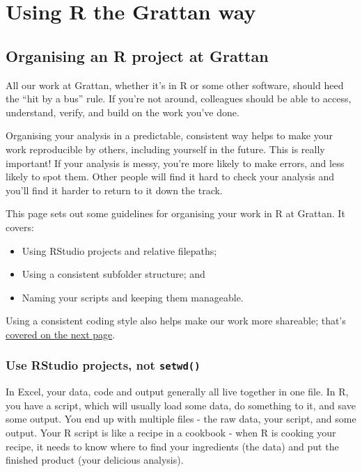 \documentclass[
]{book}
\providecommand{\tightlist}{%
  \setlength{\itemsep}{0pt}\setlength{\parskip}{0pt}}
\begin{document}
\hypertarget{part-using-r-the-grattan-way}{%
\part{Using R the Grattan way}\label{part-using-r-the-grattan-way}}

\hypertarget{organising-projects}{%
\chapter{Organising an R project at Grattan}\label{organising-projects}}

All our work at Grattan, whether it's in R or some other software, should heed the ``hit by a bus'' rule. If you're not around, colleagues should be able to access, understand, verify, and build on the work you've done.

Organising your analysis in a predictable, consistent way helps to make your work reproducible by others, including yourself in the future. This is really important! If your analysis is messy, you're more likely to make errors, and less likely to spot them. Other people will find it hard to check your analysis and you'll find it harder to return to it down the track.

This page sets out some guidelines for organising your work in R at Grattan. It covers:

\begin{itemize}
\tightlist
\item
  Using RStudio projects and relative filepaths;
\item
  Using a consistent subfolder structure; and
\item
  Naming your scripts and keeping them manageable.
\end{itemize}

Using a consistent coding style also helps make our work more shareable; that's \protect\hyperlink{coding-style}{covered on the next page}.

\hypertarget{rproj}{%
\section{\texorpdfstring{Use RStudio projects, not \texttt{setwd()}}{Use RStudio projects, not setwd()}}\label{rproj}}

In Excel, your data, code and output generally all live together in one file. In R, you have a script, which will usually load some data, do something to it, and save some output. You end up with multiple files - the raw data, your script, and some output. Your R script is like a recipe in a cookbook - when R is cooking your recipe, it needs to know where to find your ingredients (the data) and put the finished product (your delicious analysis).
\end{document}
